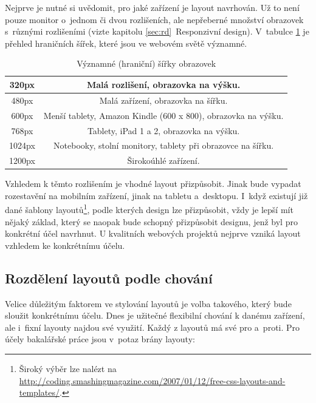 \documentclass[thesis=B,czech]{FITthesis}[2012/06/26]
\begin{document}
Nejprve je nutné si uvědomit, pro jaké zařízení je layout navrhován. Už to není pouze monitor o~jednom či dvou rozlišeních, ale nepřeberné množství obrazovek s~různými rozlišeními (vizte kapitolu \ref{sec:rd}~Responzivní design). V~tabulce \ref{tab:sirky} je přehled hraničních šířek, které jsou ve webovém světě významné.

\begin{table}\centering
 	\caption[Významné (hraniční) šířky]{Významné (hraniční) šířky obrazovek\cite{res}}\label{tab:sirky}%
 	\begin{tabular}{|c|c|}\hline
		320px & Malá rozlišení, obrazovka na výšku.\tabularnewline
		\hline 
		 480px & Malá zařízení, obrazovka na šířku.\tabularnewline
		\hline 
		600px & Menší tablety, Amazon Kindle (600 x 800), obrazovka na výšku.\tabularnewline
		\hline 
		768px & Tablety, iPad 1 a 2, obrazovka na výšku.\tabularnewline
		\hline 
		1024px & Notebooky, stolní monitory, tablety při obrazovce na šířku.\tabularnewline
		\hline 
		1200px & Širokoúhlé zařízení.\tabularnewline
		\hline 
 	\end{tabular}
\end{table}

Vzhledem k těmto rozlišením je vhodné layout přizpůsobit. Jinak bude vypadat rozestavění na mobilním zařízení, jinak na tabletu a~desktopu. I~když existují již dané šablony layoutů\footnote{Široký výběr lze nalézt na \url{http://coding.smashingmagazine.com/2007/01/12/free-css-layouts-and-templates/}.}, podle kterých design lze přizpůsobit, vždy je lepší mít nějaký základ, který se naopak bude schopný přizpůsobit designu, jenž byl pro konkrétní účel navrhnut. U kvalitních webových projektů nejprve vzniká layout vzhledem ke konkrétnímu účelu.


\subsection{Rozdělení layoutů podle chování}

Velice důležitým faktorem ve stylování layoutů je volba takového, který bude sloužit konkrétnímu účelu. Dnes je užitečné flexibilní chování k danému zařízení, ale i~fixní layouty najdou své využití. Každý z layoutů má své pro a~proti. Pro účely bakalářské práce jsou v~potaz brány layouty:
\end{document}
